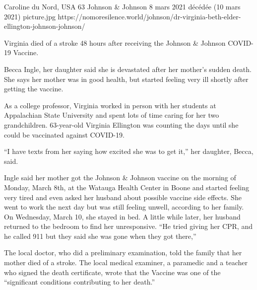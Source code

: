           {Caroline du Nord, USA}
          {63}
          {Johnson \& Johnson}
          {8 mars 2021}
          {décédée (10 mars 2021)}
          {picture.jpg}
          {https://nomoresilence.world/johnson/dr-virginia-beth-elder-ellington-johnson-johnson/}
          {

Virginia died of a stroke 48 hours after receiving the Johnson \& Johnson
COVID-19 Vaccine.

Becca Ingle, her daughter said she is devastated after her mother’s sudden
death. She says her mother was in good health, but started feeling very ill
shortly after getting the vaccine.

As a college professor, Virginia worked in person with her students at
Appalachian State University and spent lots of time caring for her two
grandchildren. 63-year-old Virginia Ellington was counting the days until she
could be vaccinated against COVID-19.

“I have texts from her saying how excited she was to get it,” her daughter,
Becca, said.

Ingle said her mother got the Johnson \& Johnson vaccine on the morning of
Monday, March 8th, at the Watauga Health Center in Boone and started feeling
very tired and even asked her husband about possible vaccine side effects. She
went to work the next day but was still feeling unwell, according to her
family. On Wednesday, March 10, she stayed in bed. A little while later, her
husband returned to the bedroom to find her unresponsive. “He tried giving her
CPR, and he called 911 but they said she was gone when they got there,”

The local doctor, who did a preliminary examination, told the family that her
mother died of a stroke. The local medical examiner, a paramedic and a teacher
who signed the death certificate, wrote that the Vaccine was one of the
“significant conditions contributing to her death.”

}

